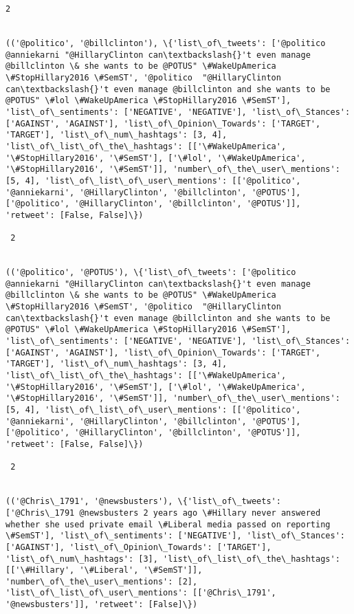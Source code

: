 \documentclass[11pt]{article}
\begin{document}
\begin{Verbatim}[commandchars=\\\{\}]
 2
 

(('@politico', '@billclinton'), \{'list\_of\_tweets': ['@politico @anniekarni "@HillaryClinton can\textbackslash{}'t even manage @billclinton \& she wants to be @POTUS" \#WakeUpAmerica \#StopHillary2016 \#SemST', '@politico  "@HillaryClinton can\textbackslash{}'t even manage @billclinton and she wants to be @POTUS" \#lol \#WakeUpAmerica \#StopHillary2016 \#SemST'], 'list\_of\_sentiments': ['NEGATIVE', 'NEGATIVE'], 'list\_of\_Stances': ['AGAINST', 'AGAINST'], 'list\_of\_Opinion\_Towards': ['TARGET', 'TARGET'], 'list\_of\_num\_hashtags': [3, 4], 'list\_of\_list\_of\_the\_hashtags': [['\#WakeUpAmerica', '\#StopHillary2016', '\#SemST'], ['\#lol', '\#WakeUpAmerica', '\#StopHillary2016', '\#SemST']], 'number\_of\_the\_user\_mentions': [5, 4], 'list\_of\_list\_of\_user\_mentions': [['@politico', '@anniekarni', '@HillaryClinton', '@billclinton', '@POTUS'], ['@politico', '@HillaryClinton', '@billclinton', '@POTUS']], 'retweet': [False, False]\})

 2
 

(('@politico', '@POTUS'), \{'list\_of\_tweets': ['@politico @anniekarni "@HillaryClinton can\textbackslash{}'t even manage @billclinton \& she wants to be @POTUS" \#WakeUpAmerica \#StopHillary2016 \#SemST', '@politico  "@HillaryClinton can\textbackslash{}'t even manage @billclinton and she wants to be @POTUS" \#lol \#WakeUpAmerica \#StopHillary2016 \#SemST'], 'list\_of\_sentiments': ['NEGATIVE', 'NEGATIVE'], 'list\_of\_Stances': ['AGAINST', 'AGAINST'], 'list\_of\_Opinion\_Towards': ['TARGET', 'TARGET'], 'list\_of\_num\_hashtags': [3, 4], 'list\_of\_list\_of\_the\_hashtags': [['\#WakeUpAmerica', '\#StopHillary2016', '\#SemST'], ['\#lol', '\#WakeUpAmerica', '\#StopHillary2016', '\#SemST']], 'number\_of\_the\_user\_mentions': [5, 4], 'list\_of\_list\_of\_user\_mentions': [['@politico', '@anniekarni', '@HillaryClinton', '@billclinton', '@POTUS'], ['@politico', '@HillaryClinton', '@billclinton', '@POTUS']], 'retweet': [False, False]\})

 2
 

(('@Chris\_1791', '@newsbusters'), \{'list\_of\_tweets': ['@Chris\_1791 @newsbusters 2 years ago \#Hillary never answered whether she used private email \#Liberal media passed on reporting \#SemST'], 'list\_of\_sentiments': ['NEGATIVE'], 'list\_of\_Stances': ['AGAINST'], 'list\_of\_Opinion\_Towards': ['TARGET'], 'list\_of\_num\_hashtags': [3], 'list\_of\_list\_of\_the\_hashtags': [['\#Hillary', '\#Liberal', '\#SemST']], 'number\_of\_the\_user\_mentions': [2], 'list\_of\_list\_of\_user\_mentions': [['@Chris\_1791', '@newsbusters']], 'retweet': [False]\})


\end{Verbatim}
\end{document}
